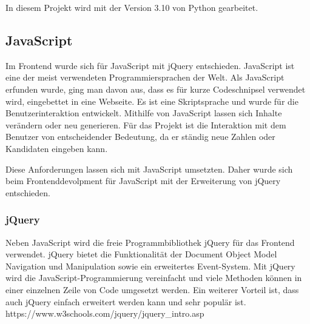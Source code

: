 In diesem Projekt wird mit der Version 3.10 von Python gearbeitet. \cite{Python} \cite{DataToolkit}

\subsection{JavaScript}
Im Frontend wurde sich für JavaScript mit jQuery entschieden. JavaScript ist eine der meist verwendeten Programmiersprachen der Welt. Als JavaScript erfunden wurde, ging man davon aus, dass es für kurze Codeschnipsel verwendet wird, eingebettet in eine Webseite. Es ist eine Skriptsprache und wurde für die Benutzerinteraktion entwickelt. Mithilfe von JavaScript lassen sich Inhalte verändern oder neu generieren. Für das Projekt ist die Interaktion mit dem Benutzer von entscheidender Bedeutung, da er ständig neue Zahlen oder Kandidaten eingeben kann. 

Diese Anforderungen lassen sich mit JavaScript umsetzten. Daher wurde sich beim Frontenddevolpment für JavaScript mit der Erweiterung von jQuery entschieden. 


\subsubsection{jQuery}
Neben JavaScript wird die freie Programmbibliothek jQuery für das Frontend verwendet. jQuery bietet die Funktionalität der Document Object Model Navigation und Manipulation sowie ein erweitertes Event-System. Mit jQuery wird die JavaScript-Programmierung vereinfacht und viele Methoden können in einer einzelnen Zeile von Code umgesetzt werden. Ein weiterer Vorteil ist, dass auch jQuery einfach erweitert werden kann und sehr populär ist. https://www.w3schools.com/jquery/jquery\_intro.asp


